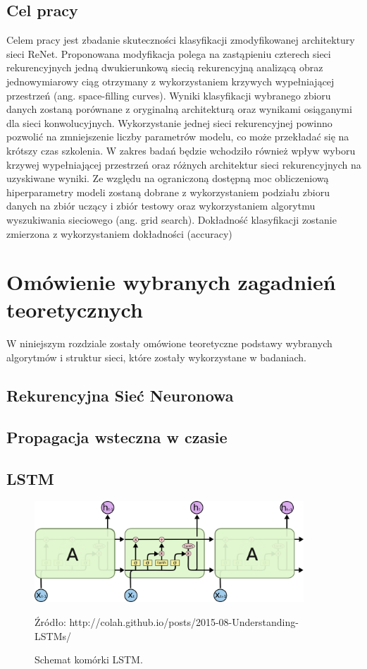 \documentclass[oneside, mag]{mgr}
\begin{document}
\section{Cel pracy}

Celem pracy jest zbadanie skuteczności klasyfikacji zmodyfikowanej architektury sieci ReNet. Proponowana modyfikacja polega na zastąpieniu czterech sieci rekurencyjnych jedną dwukierunkową siecią rekurencyjną analizącą obraz jednowymiarowy ciąg otrzymany z wykorzystaniem krzywych wypełniającej przestrzeń (ang. space-filling curves). Wyniki klasyfikacji wybranego zbioru danych zostaną porównane z oryginalną architekturą oraz wynikami osiąganymi dla sieci konwolucyjnych. Wykorzystanie jednej sieci rekurencyjnej powinno pozwolić na zmniejszenie liczby parametrów modelu, co może przekładać się na krótszy czas szkolenia. W zakres badań będzie wchodziło również wpływ wyboru krzywej wypełniającej przestrzeń oraz różnych architektur sieci rekurencyjnych na uzyskiwane wyniki. Ze względu na ograniczoną dostępną moc obliczeniową hiperparametry modeli zostaną dobrane z wykorzystaniem podziału zbioru danych na zbiór uczący i zbiór testowy oraz wykorzystaniem algorytmu wyszukiwania sieciowego (ang. grid search). Dokładność klasyfikacji zostanie zmierzona z wykorzystaniem dokładności (accuracy)

\chapter{Omówienie wybranych zagadnień teoretycznych}

W niniejszym rozdziale zostały omówione teoretyczne podstawy wybranych algorytmów i struktur sieci, które zostały wykorzystane w badaniach.

\section{Rekurencyjna Sieć Neuronowa}

\section{Propagacja wsteczna w czasie}

\section{LSTM}

\begin{figure}
\centering
	\includegraphics[width=0.90\textwidth]{img/lstm_colah.png}
	\caption{Schemat komórki LSTM.} Źródło: http://colah.github.io/posts/2015-08-Understanding-LSTMs/
	\label{fig:lstm}
\end{figure}
\end{document}
